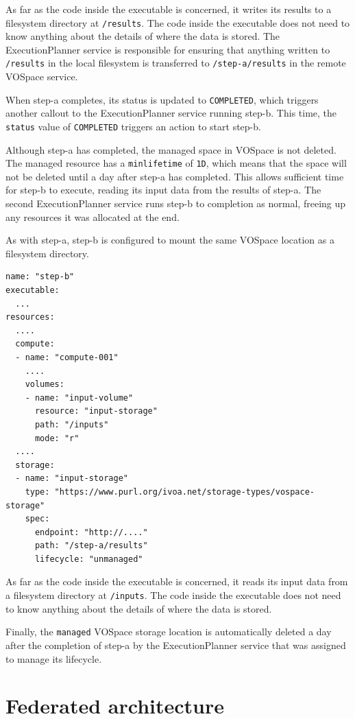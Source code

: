 \documentclass[11pt,a4paper]{ivoa}
\newcommand{\vospace} {VOSpace}
\newcommand{\execplanner} {ExecutionPlanner}
\newcommand{\codeword}[1] {\texttt{#1}}
\begin{document}
As far as the code inside the executable is concerned, it writes its results to a
filesystem directory at \codeword{/results}.
The code inside the executable does not need to know anything about the
details of where the data is stored.
The \execplanner{} service is responsible for ensuring that anything written to
\codeword{/results} in the local filesystem is transferred to \codeword{/step-a/results}
in the remote \vospace{} service.

When step-a completes, its status is updated to \codeword{COMPLETED},
which triggers another callout to the \execplanner{} service running step-b.
This time, the \codeword{status} value of \codeword{COMPLETED} triggers
an action to start step-b.

Although step-a has completed, the managed space in \vospace{} is not deleted.
The managed resource has a \codeword{minlifetime} of \codeword{1D},
which means that the space will not be deleted until a day after step-a has completed.
This allows sufficient time for step-b to execute, reading its input data
from the results of step-a.
The second \execplanner{} service runs step-b to completion as normal,
freeing up any resources it was allocated at the end.

As with step-a, step-b is configured to mount the same \vospace{} location
as a filesystem directory.

\begin{lstlisting}[]
name: "step-b"
executable:
  ...
resources:
  ....
  compute:
  - name: "compute-001"
    ....
    volumes:
    - name: "input-volume"
      resource: "input-storage"
      path: "/inputs"
      mode: "r"
  ....
  storage:
  - name: "input-storage"
    type: "https://www.purl.org/ivoa.net/storage-types/vospace-storage"
    spec:
      endpoint: "http://...."
      path: "/step-a/results"
      lifecycle: "unmanaged"
\end{lstlisting}

As far as the code inside the executable is concerned, it reads
its input data from a filesystem directory at \codeword{/inputs}.
The code inside the executable does not need to know anything about the
details of where the data is stored.

Finally, the \codeword{managed} \vospace{} storage location is automatically
deleted a day after the completion of step-a by the \execplanner{} service
that was assigned to manage its lifecycle.

\pagebreak

\section{Federated architecture}
\label{federation}
\end{document}
